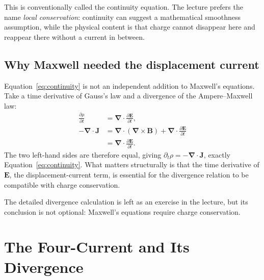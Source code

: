 This is conventionally called the continuity equation.  The lecture
prefers the name \emph{local conservation}: continuity can suggest a
mathematical smoothness assumption, while the physical content is that
charge cannot disappear here and reappear there without a current in
between.

\subsection{Why Maxwell needed the displacement current}

Equation~\eqref{eq:continuity} is not an independent addition to Maxwell's
equations.  Take a time derivative of Gauss's law and a divergence of the
Ampere--Maxwell law:
\begin{align}
\frac{\partial\rho}{\partial t}
&=
\boldsymbol\nabla\cdot
\frac{\partial\mathbf E}{\partial t},
\\
-\boldsymbol\nabla\cdot\mathbf J
&=
\boldsymbol\nabla\cdot
(\boldsymbol\nabla\times\mathbf B)
+
\boldsymbol\nabla\cdot
\frac{\partial\mathbf E}{\partial t}
\\
&=
\boldsymbol\nabla\cdot
\frac{\partial\mathbf E}{\partial t}.
\end{align}
The two left-hand sides are therefore equal, giving
\(\partial_t\rho=-\boldsymbol\nabla\cdot\mathbf J\), exactly
Equation~\eqref{eq:continuity}.  What matters structurally is that the time
derivative of \(\mathbf E\), the displacement-current term, is essential for
the divergence relation to be compatible with charge conservation.

\begin{classroomqa}
\end{classroomqa}

The detailed divergence calculation is left as an exercise in the lecture,
but its conclusion is not optional: Maxwell's equations require charge
conservation.

\section{The Four-Current and Its Divergence}

